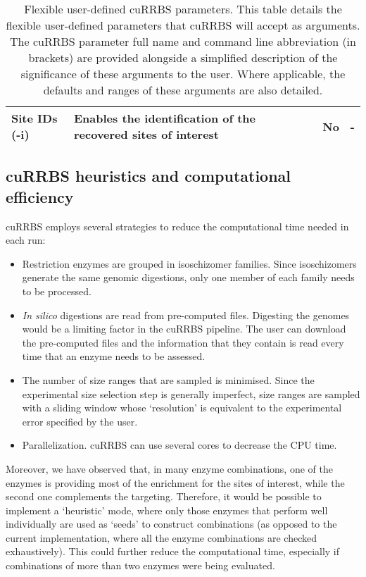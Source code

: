 \begin{table}
\begin{tabular}{ p{5cm} p{6.5cm} p{1cm} p{1.5cm} }
		Site IDs (-i) & Enables the identification of the recovered sites of interest & No & - \\
		\bottomrule
	\end{tabular}
	\vspace*{3mm}
	\caption[Flexible user-defined cuRRBS parameters]{Flexible user-defined cuRRBS parameters. This table details the flexible user-defined parameters that cuRRBS will accept as arguments. The cuRRBS parameter full name and command line abbreviation (in brackets) are provided alongside a simplified description of the significance of these arguments to the user. Where applicable, the defaults and ranges of these arguments are also detailed.}
	\label{table:c4_table1}
\end{table}


\subsection*{cuRRBS heuristics and computational efficiency}

cuRRBS employs several strategies to reduce the computational time needed in each run:

\begin{itemize}
	
	\item Restriction enzymes are grouped in isoschizomer families. Since isoschizomers generate the same genomic digestions, only one member of each family needs to be processed. 
	
	\item \textit{In silico} digestions are read from pre-computed files. Digesting the genomes would be a limiting factor in the cuRRBS pipeline. The user can download the pre-computed files \cite{Martin-Herranz2017} and the information that they contain is read every time that an enzyme needs to be assessed.
	
	\item The number of size ranges that are sampled is minimised. Since the experimental size selection step is generally imperfect, size ranges are sampled with a sliding window whose `resolution' is equivalent to the experimental error specified by the user. 
	
	\item Parallelization. cuRRBS can use several cores to decrease the \acrshort{CPU} time.

\end{itemize}

Moreover, we have observed that, in many enzyme combinations, one of the enzymes is providing most of the enrichment for the sites of interest, while the second one complements the targeting. Therefore, it would be possible to implement a `heuristic' mode, where only those enzymes that perform well individually are used as `seeds' to construct combinations (as opposed to the current implementation, where all the enzyme combinations are checked exhaustively). This could further reduce the computational time, especially if combinations of more than two enzymes were being evaluated. 

